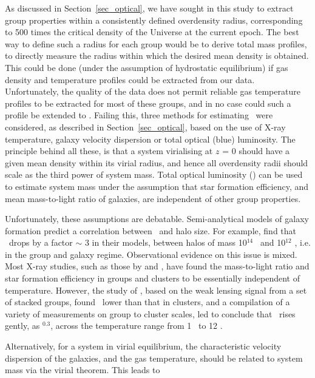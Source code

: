 \documentclass[usenatbib]{mn2e}
\begin{document}
As discussed in Section~\ref{sec_optical}, we have sought in this study to
extract group properties within a consistently defined overdensity radius,
corresponding to 500 times the critical density of the Universe at the current
epoch.  The best way to define such a radius for each group would be to derive
total mass profiles, to directly measure the radius within which the desired mean
density is obtained.  This could be done (under the assumption of hydrostatic
equilibrium) if gas density and temperature profiles could be extracted
from our data.  Unfortunately, the quality of the data does not permit reliable
gas temperature profiles to be extracted for most of these groups, and in no case
could such a profile be extended to \rfh.  Failing this, three methods for
estimating \rfh\ were considered, as described in Section~\ref{sec_optical},
based on the use of X-ray temperature, galaxy velocity dispersion or total
optical (blue) luminosity.  The principle behind all these, is that a system
virialising at $z$ = 0 should have a given mean density within its virial radius,
and hence all overdensity radii should scale as the third power of system mass.
Total optical luminosity (\LB) can be used to estimate system mass under the
assumption that star formation efficiency, and mean mass-to-light ratio of
galaxies, are independent of other group properties.

Unfortunately, these assumptions are debatable. Semi-analytical models of galaxy
formation predict a correlation between \MpL\ and halo size.  For example,
\citet{benson00} find that \MpL\ drops by a factor $\sim$ 3 in their models,
between halos of mass 10$^{14}$ \Msol\ and 10$^{12}$ \Msol, i.e. in the group and
galaxy regime.  Observational evidence on this issue is mixed.  Most X-ray
studies, such as those by \citet{hradecky00} and \citet{sanderson03b}, have found
the mass-to-light ratio and star formation efficiency in groups and clusters to
be essentially independent of temperature.  However, the study of
\citet{hoekstra01}, based on the weak lensing signal from a set of stacked
groups, found \MpL\ lower than that in clusters, and a compilation of a variety
of measurements on group to cluster scales, led \citet{bahcall02} to conclude
that \MpL\ rises gently, as \TX$^{0.3}$, across the temperature range from 1 \kev\
to 12 \kev.

Alternatively, for a system in virial equilibrium, the characteristic velocity
dispersion of the galaxies, and the gas temperature, should be related to system
mass via the virial theorem.  This leads to
\end{document}
